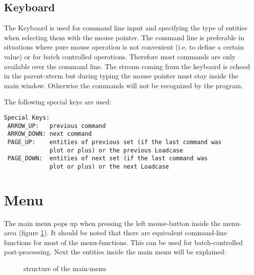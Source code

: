 \documentclass{article}
\begin{document}
\subsection{\label{Keyboard}Keyboard}
The Keyboard is used for command line input and specifying the type of entities when selecting them with the mouse pointer. The command line is preferable in situations where pure mouse operation is not convenient (i.e. to define a certain value) or for batch controlled operations. Therefore most commands are only available over the command line. The stream coming from the keyboard is echoed in the parent-xterm but during typing the mouse pointer must stay inside the main window. Otherwise the commands will not be recognized by the program. 

The following special keys are used:
\begin{verbatim}
Special Keys:
 ARROW_UP:   previous command
 ARROW_DOWN: next command
 PAGE_UP:    entities of previous set (if the last command was
             plot or plus) or the previous Loadcase
 PAGE_DOWN:  entities of next set (if the last command was 
             plot or plus) or the next Loadcase
\end{verbatim}



\section{\label{Menu}Menu}
The main menu pops up when pressing the left mouse-button inside the menu-area (figure \ref{mainmenu}). It should be noted that there are equivalent command-line functions for most of the menu-functions. This can be used for batch-controlled post-processing. Next the entities inside the main menu will be explained:
  
\begin{figure}[h]
\caption{\label{mainmenu}structure of the main-menu}
\end{figure}
\end{document}
